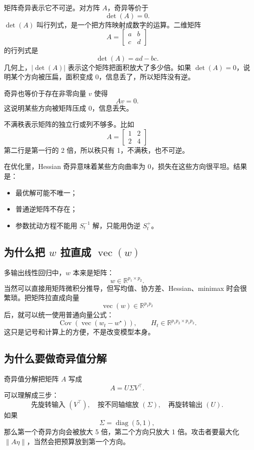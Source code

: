 \documentclass[UTF8,fontset=none,11pt]{ctexart}
\theoremstyle{cnstyle}
\newcommand{\R}{\mathbb{R}}
\newcommand{\Cov}{\operatorname{Cov}}
\newcommand{\diag}{\operatorname{diag}}
\newcommand{\vect}{\operatorname{vec}}
\newcommand{\norm}[1]{\left\lVert #1\right\rVert}
\begin{document}
矩阵奇异表示它不可逆。对方阵 \(A\)，奇异等价于
\[
  \det(A)=0.
\]
\(\det(A)\) 叫行列式，是一个把方阵映射成数字的运算。二维矩阵
\[
  A=
  \begin{bmatrix}
  a&b\\
  c&d
  \end{bmatrix}
\]
的行列式是
\[
  \det(A)=ad-bc.
\]
几何上，\(|\det(A)|\) 表示这个矩阵把面积放大了多少倍。如果 \(\det(A)=0\)，说明某个方向被压扁，面积变成 0，信息丢了，所以矩阵没有逆。

奇异也等价于存在非零向量 \(v\) 使得
\[
  Av=0.
\]
这说明某些方向被矩阵压成 0，信息丢失。

不满秩表示矩阵的独立行或列不够多。比如
\[
  A=
  \begin{bmatrix}
  1&2\\
  2&4
  \end{bmatrix}
\]
第二行是第一行的 2 倍，所以秩只有 1，不满秩，也不可逆。

在优化里，Hessian 奇异意味着某些方向曲率为 0，损失在这些方向很平坦。结果是：
\begin{itemize}
  \item 最优解可能不唯一；
  \item 普通逆矩阵不存在；
  \item 参数扰动方程不能用 \(S_t^{-1}\) 解，只能用伪逆 \(S_t^+\)。
\end{itemize}

\subsection{为什么把 \(w\) 拉直成 \(\vect(w)\)}

多输出线性回归中，\(w\) 本来是矩阵：
\[
  w\in\R^{p_1\times p_2}.
\]
当然可以直接用矩阵微积分推导，但写均值、协方差、Hessian、minimax 时会很繁琐。把矩阵拉直成向量
\[
  \vect(w)\in\R^{p_1p_2}
\]
后，就可以统一使用普通向量公式：
\[
  \Cov(\vect(w_t-w^\star)),\qquad
  H_t\in\R^{p_1p_2\times p_1p_2}.
\]
这只是记号和计算上的方便，不是改变模型本身。

\subsection{为什么要做奇异值分解}

奇异值分解把矩阵 \(A\) 写成
\[
  A=U\Sigma V^\top.
\]
可以理解成三步：
\[
  \text{先旋转输入 }(V^\top),\quad
  \text{按不同轴缩放 }(\Sigma),\quad
  \text{再旋转输出 }(U).
\]
如果
\[
  \Sigma=\diag(5,1),
\]
那么第一个奇异方向会被放大 5 倍，第二个方向只放大 1 倍。攻击者要最大化 \(\norm{A\eta}\)，当然会把预算放到第一个方向。
\end{document}
